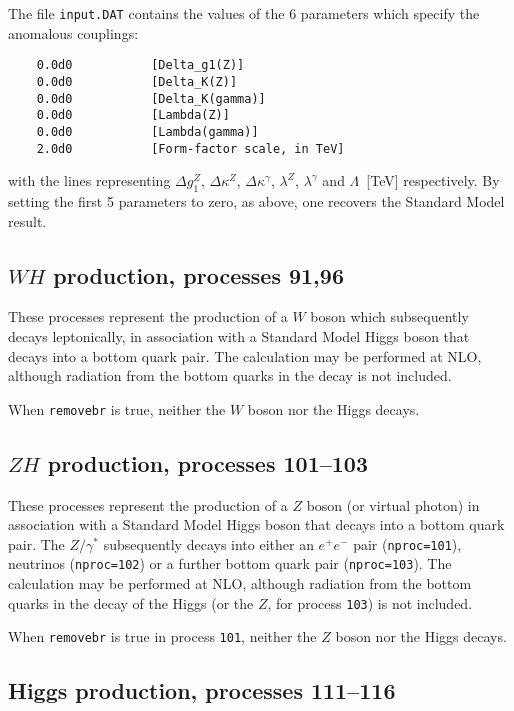 \documentclass[12pt]{article}
\begin{document}
The file {\tt input.DAT} contains the values of the $6$ parameters
which specify the anomalous couplings:
\begin{verbatim}
    0.0d0           [Delta_g1(Z)]
    0.0d0           [Delta_K(Z)]
    0.0d0           [Delta_K(gamma)]
    0.0d0           [Lambda(Z)]
    0.0d0           [Lambda(gamma)]
    2.0d0           [Form-factor scale, in TeV]
\end{verbatim}
with the lines representing $\Delta g_1^Z$, $\Delta \kappa^Z$,
$\Delta \kappa^\gamma$, $\lambda^Z$, $\lambda^\gamma$ and
$\Lambda$~[TeV] respectively. By setting the first 5 parameters to zero,
as above, one recovers the Standard Model result.

\subsection{$WH$ production, processes 91,96}
\label{subsec:wh}

These processes represent the production of a $W$ boson which subsequently
decays leptonically, in association with a Standard Model Higgs boson that
decays into a bottom quark pair.
The calculation may be performed at NLO, although radiation from the
bottom quarks in the decay is not included.

When {\tt removebr} is true, neither the $W$ boson nor the Higgs decays.

\subsection{$ZH$ production, processes 101--103}
\label{subsec:zh}

These processes represent the production of a $Z$ boson (or virtual photon)
in association with a Standard Model Higgs boson that
decays into a bottom quark pair. The $Z/\gamma^*$ subsequently decays into 
either an $e^+ e^-$ pair ({\tt nproc=101}), neutrinos ({\tt nproc=102})
or a further bottom quark pair ({\tt nproc=103}).
The calculation may be performed at NLO, although radiation from the
bottom quarks in the decay of the Higgs (or the $Z$, for process
{\tt 103}) is not included.

When {\tt removebr} is true in process {\tt 101}, neither the $Z$ boson
nor the Higgs decays.

\subsection{Higgs production, processes 111--116}
\label{subsec:h}
\end{document}
